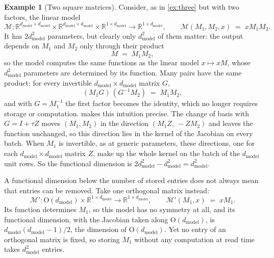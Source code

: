 \documentclass[10pt]{article}
\theoremstyle{definition}
\newtheorem*{example*}{Example}
\theoremstyle{remark}
\newcommand{\R}{\mathbb{R}}
\newcommand{\dm}{d_{\mathrm{model}}}
\newcommand{\Ort}{\mathrm{O}}
\begin{document}
\begin{example*}[Two square matrices]
Consider, as in \cref{ex:three} but with two factors, the linear model
\[
\mathcal{M} \colon \R^{\dm\times\dm} \times \R^{\dm\times\dm} \times \R^{1\times\dm} \to \R^{1\times\dm}, \qquad \mathcal{M}(M_1, M_2, x) \;=\; xM_1M_2 .
\]
It has $2\dm^2$ parameters, but clearly only $\dm^2$ of them matter: the output depends on $M_1$ and $M_2$ only through their product
\[
M \;=\; M_1M_2 ,
\]
so the model computes the same functions as the linear model $x \mapsto xM$, whose $\dm^2$ parameters are determined by its function. Many pairs have the same product: for every invertible $\dm\times\dm$ matrix $G$,
\[
(M_1G)\,(G^{-1}M_2) \;=\; M_1M_2 ,
\]
and with $G = M_1^{-1}$ the first factor becomes the identity, which no longer requires storage or computation.  makes this intuition precise. The change of basis with $G = I + \tau Z$ moves $(M_1, M_2)$ in the direction $(M_1Z,\ -ZM_2)$ and leaves the function unchanged, so this direction lies in the kernel of the Jacobian on every batch. When $M_1$ is invertible, as at generic parameters, these directions, one for each $\dm\times\dm$ matrix $Z$, make up the whole kernel on the batch of the $\dm$ unit rows. So the functional dimension is $2\dm^2 - \dm^2 = \dm^2$.

A functional dimension below the number of stored entries does not always mean that entries can be removed. Take one orthogonal matrix instead:
\[
\mathcal{M}' \colon \Ort(\dm) \times \R^{1\times\dm} \to \R^{1\times\dm}, \qquad \mathcal{M}'(M_1, x) \;=\; xM_1 .
\]
Its function determines $M_1$, so this model has no symmetry at all, and its functional dimension, with the Jacobian taken along $\Ort(\dm)$, is $\dm(\dm-1)/2$, the dimension of $\Ort(\dm)$. Yet no entry of an orthogonal matrix is fixed, so storing $M_1$ without any computation at read time takes $\dm^2$ entries.
\end{example*}

\propLocalId*
\end{document}
